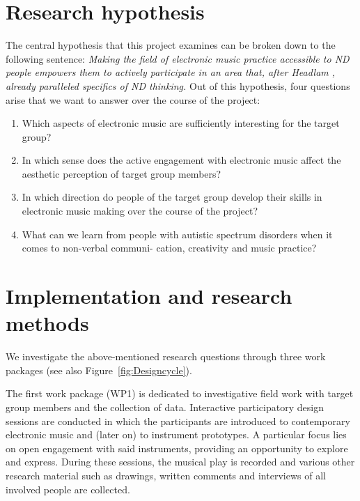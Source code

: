 \documentclass{chi-ext}
\begin{document}
\begin{multicols}{2}
\section{Research hypothesis}
\label{sec:research_objectives}


The central hypothesis that this project examines can be broken down to the following sentence: 
\emph{Making the field of electronic music practice accessible to ND people empowers them to actively participate in an area that, after Headlam \cite{headlam2006-lea}, already paralleled specifics of ND thinking.}
Out of this hypothesis, four questions arise that we want to answer over the course of the project:

\begin{enumerate}
	\item Which aspects of electronic music are sufficiently interesting for the target group?
	\item In which sense does the active engagement with electronic music affect the aesthetic perception of target group members?
	\item In which direction do people of the target group develop their skills in electronic music making over the course of the project?
	\item What can we learn from people with autistic spectrum disorders when it comes to non-verbal communi- cation, creativity and music practice?
\end{enumerate}

\section{Implementation and research methods}
\label{sec:timeline}


We investigate the above-mentioned research questions through three work packages (see also  Figure~\ref{fig:Designcycle}).

The first work package (WP1) is dedicated to investigative field work with target group members and the collection of data.
Interactive participatory design sessions are conducted in which the participants are introduced to contemporary electronic music and (later on) to instrument prototypes. 
A particular focus lies on open engagement with said instruments, providing an opportunity to explore and express.
During these sessions, the musical play is recorded and various other research material such as drawings, written comments and interviews of all involved people are collected.


\end{multicols}
\end{document}
